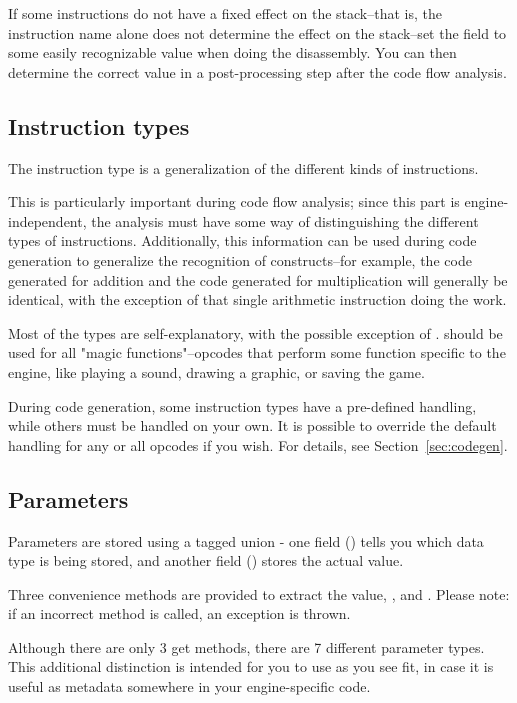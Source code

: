 If some instructions do not have a fixed effect on the stack--that is, the instruction name alone does not determine the effect on the stack--set the field to some easily recognizable value when doing the disassembly. You can then determine the correct value in a post-processing step after the code flow analysis.

\subsection{Instruction types}
\label{sec:insttype}
The instruction type is a generalization of the different kinds of instructions.

This is particularly important during code flow analysis; since this part is engine-independent, the analysis must have some way of distinguishing the different types of instructions. Additionally, this information can be used during code generation to generalize the recognition of constructs--for example, the code generated for addition and the code generated for multiplication will generally be identical, with the exception of that single arithmetic instruction doing the work.

Most of the types are self-explanatory, with the possible exception of .  should be used for all "magic functions"--opcodes that perform some function specific to the engine, like playing a sound, drawing a graphic, or saving the game.

During code generation, some instruction types have a pre-defined handling, while others must be handled on your own. It is possible to override the default handling for any or all opcodes if you wish. For details, see Section~\vref{sec:codegen}.

\subsection{Parameters}
\label{sec:parameter}
Parameters are stored using a tagged union - one field () tells you which data type is being stored, and another field () stores the actual value.

Three convenience methods are provided to extract the value, ,  and . Please note: if an incorrect method is called, an exception is thrown.

Although there are only 3 get methods, there are 7 different parameter types. This additional distinction is intended for you to use as you see fit, in case it is useful as metadata somewhere in your engine-specific code.

